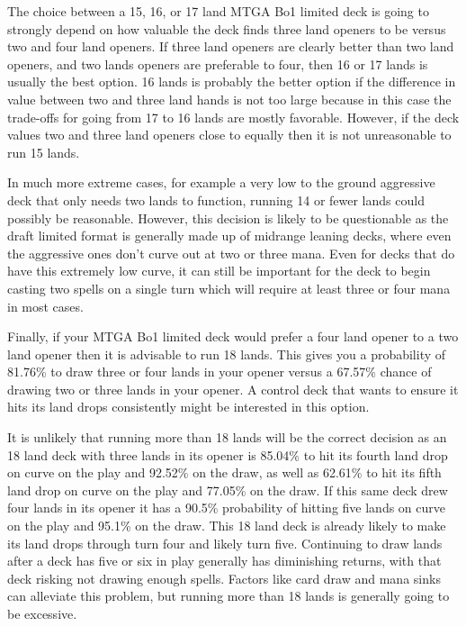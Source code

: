\documentclass[oneside]{book}   %
\begin{document}
The choice between a 15, 16, or 17 land MTGA Bo1 limited deck is going to strongly depend on how valuable the deck finds three land openers to be versus two and four land openers. If three land openers are clearly better than two land openers, and two lands openers are preferable to four, then 16 or 17 lands is usually the best option. 16 lands is probably the better option if the difference in value between two and three land hands is not too large because in this case the trade-offs for going from 17 to 16 lands are mostly favorable. However, if the deck values two and three land openers close to equally then it is not unreasonable to run 15 lands. 

In much more extreme cases, for example a very low to the ground aggressive deck that only needs two lands to function, running 14 or fewer lands could possibly be reasonable. However, this decision is likely to be questionable as the draft limited format is generally made up of midrange leaning decks, where even the aggressive ones don't curve out at two or three mana. Even for decks that do have this extremely low curve, it can still be important for the deck to begin casting two spells on a single turn which will require at least three or four mana in most cases.

Finally, if your MTGA Bo1 limited deck would prefer a four land opener to a two land opener then it is advisable to run 18 lands. This gives you a probability of 81.76\% to draw three or four lands in your opener versus a 67.57\% chance of drawing two or three lands in your opener. A control deck that wants to ensure it hits its land drops consistently might be interested in this option. 

It is unlikely that running more than 18 lands will be the correct decision as an 18 land deck with three lands in its opener is 85.04\% to hit its fourth land drop on curve on the play and 92.52\% on the draw, as well as 62.61\% to hit its fifth land drop on curve on the play and 77.05\% on the draw. If this same deck drew four lands in its opener it has a 90.5\% probability of hitting five lands on curve on the play and 95.1\% on the draw. This 18 land deck is already likely to make its land drops through turn four and likely turn five. Continuing to draw lands after a deck has five or six in play generally has diminishing returns, with that deck risking not drawing enough spells. Factors like card draw and mana sinks can alleviate this problem, but running more than 18 lands is generally going to be excessive. 
\end{document}
